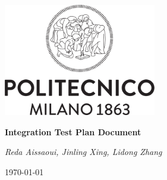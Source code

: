 \begin{titlepage}
\centering
\includegraphics[width=0.50\textwidth]{ITPD/resources/logo_polimi.png}\par
\vspace{1.5cm}
{\LARGE \textbf{Integration Test Plan Document} \par}
\vspace{0.2cm}
{\large {}\par}
\vspace{1.0cm}
{\large\itshape Reda Aissaoui,  Jinling Xing,  Lidong Zhang\par}
\vspace{2cm}
\vfill
{\large \today \par}
\end{titlepage}
